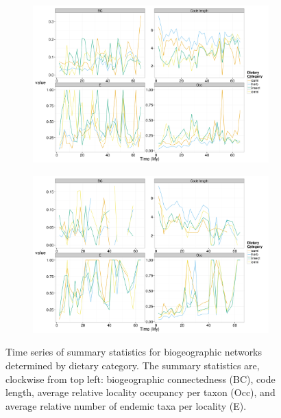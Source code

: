 \documentclass[12pt,letterpaper]{article}
\begin{document}
\begin{figure}[ht]
  \begin{center}
    \begin{subfigure}[b]{0.4\textwidth}
      \caption{}
      \includegraphics[width = \textwidth, keepaspectratio = true]{figure/na_dt}
      \label{subfig:diet_con_na}
    \end{subfigure}
    \begin{subfigure}[b]{0.4\textwidth}
      \caption{}
      \includegraphics[width = \textwidth, keepaspectratio = true]{figure/er_dt}
      \label{subfig:diet_con_er}
    \end{subfigure}
  \end{center}
  \caption[Dietary category based community connectedness]{Time series of summary statistics for biogeographic networks determined by dietary category. The summary statistics are, clockwise from top left: biogeographic connectedness (BC), code length, average relative locality occupancy per taxon (Occ), and average relative number of endemic taxa per locality (E).} 
  \label{fig:diet_con}
\end{figure}
\end{document}
